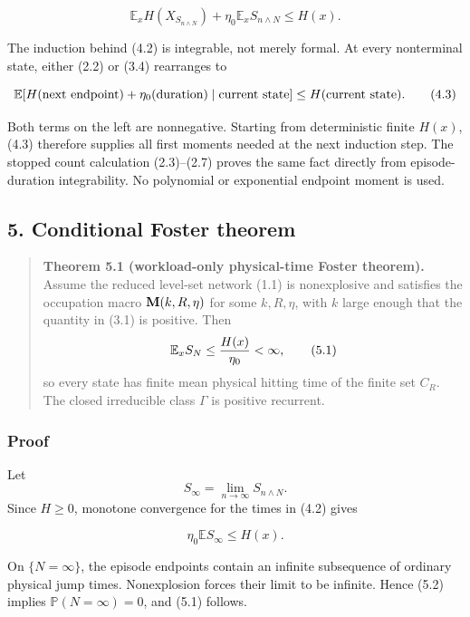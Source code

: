 \[
             {\mathbb E}_xH(X_{S_{n\wedge N}})
                 +\eta_0{\mathbb E}_xS_{n\wedge N}
                         \le H(x).                     \tag{4.2}
\]

The induction behind (4.2) is integrable, not merely formal. At every
nonterminal state, either (2.2) or (3.4) rearranges to

\[
 {\mathbb E}[H(\hbox{next endpoint})+\eta_0(\hbox{duration})
       \mid\hbox{current state}]\le H(\hbox{current state}).        \tag{4.3}
\]

Both terms on the left are nonnegative. Starting from deterministic
finite \(H(x)\), (4.3) therefore supplies all first moments needed at
the next induction step. The stopped count calculation (2.3)--(2.7)
proves the same fact directly from episode-duration integrability. No
polynomial or exponential endpoint moment is used.

\subsection{5. Conditional Foster
theorem}

\begin{quote}
\textbf{Theorem 5.1 (workload-only physical-time Foster theorem).}
Assume the reduced level-set network (1.1) is nonexplosive and satisfies
the occupation macro \({\bf M}(k,R,\eta)\) for some \(k,R,\eta\), with
\(k\) large enough that the quantity in (3.1) is positive. Then \[
                   {\mathbb E}_x S_N
                           \le {H(x)\over\eta_0}<\infty,             \tag{5.1}
\] so every state has finite mean physical hitting time of the finite
set \(C_R\). The closed irreducible class \(\Gamma\) is positive
recurrent.
\end{quote}

\subsubsection{Proof}

Let \[
                         S_\infty=\lim_{n\to\infty}S_{n\wedge N}.
\] Since \(H\ge0\), monotone convergence for the times in (4.2) gives

\[
                    \eta_0{\mathbb E}S_\infty\le H(x).                \tag{5.2}
\]

On \(\{N=\infty\}\), the episode endpoints contain an infinite
subsequence of ordinary physical jump times. Nonexplosion forces their
limit to be infinite. Hence (5.2) implies \({\mathbb P}(N=\infty)=0\),
and (5.1) follows.

